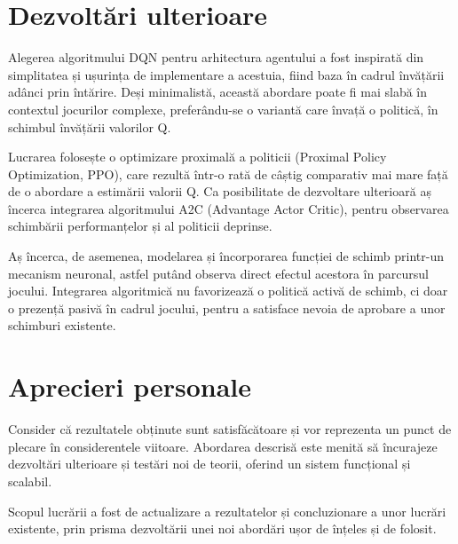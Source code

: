 \section{Dezvoltări ulterioare}
Alegerea algoritmului DQN pentru arhitectura agentului a fost inspirată din simplitatea și ușurința de implementare a acestuia, fiind baza în cadrul învățării adânci prin întărire. Deși minimalistă, această abordare poate fi mai slabă în contextul jocurilor complexe, preferându-se o variantă care învață o politică, în schimbul învățării valorilor Q.

Lucrarea \cite{hybrid_monopoly} folosește o optimizare proximală a politicii (Proximal Policy Optimization, PPO), care rezultă într-o rată de câștig comparativ mai mare față de o abordare a estimării valorii Q. Ca posibilitate de dezvoltare ulterioară aș încerca integrarea algoritmului A2C (Advantage Actor Critic), pentru observarea schimbării performanțelor și al politicii deprinse.

Aș încerca, de asemenea, modelarea și încorporarea funcției de schimb printr-un mecanism neuronal, astfel putând observa direct efectul acestora în parcursul jocului. Integrarea algoritmică nu favorizează o politică activă de schimb, ci doar o prezență pasivă în cadrul jocului, pentru a satisface nevoia de aprobare a unor schimburi existente.

\section{Aprecieri personale}
Consider că rezultatele obținute sunt satisfăcătoare și vor reprezenta un punct de plecare în considerentele viitoare. Abordarea descrisă este menită să încurajeze dezvoltări ulterioare și testări noi de teorii, oferind un sistem funcțional și scalabil.

Scopul lucrării a fost de actualizare a rezultatelor și concluzionare a unor lucrări existente, prin prisma dezvoltării unei noi abordări ușor de înțeles și de folosit.
